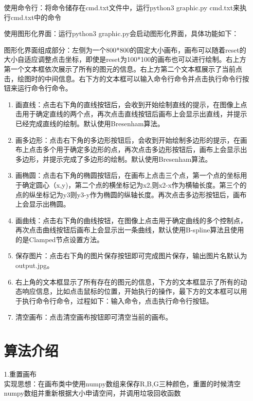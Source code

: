 \documentclass[a4paper,UTF8]{article}
\theoremstyle{definition}
\begin{document}
使用命令行：将命令储存在cmd.txt文件中，运行python3 graphic.py cmd.txt来执行cmd.txt中的命令

使用图形化界面：运行python3 graphic.py会启动图形化界面，具体功能如下：

图形化界面组成部分：左侧为一个800*800的固定大小画布，画布可以随着reset的大小自适应调整点击坐标，即使是reset为100*100的画布也可以进行绘制。右上方第一个文本框依次展示了所有的图元的信息。右上方第二个文本框展示了当前点击，绘图时的中间信息。右下方的文本框可以输入命令行命令并点击执行命令行按钮来运行命令行命令。

\begin{enumerate}
\item 画直线：点击右下角的直线按钮后，会收到开始绘制直线的提示，在图像上点击用于确定直线的两个点，再次点击直线按钮后画布上会显示出直线，并提示已经完成直线的绘制。默认使用Bresenham算法。
\item 画多边形：点击右下角的多边形按钮后，会收到开始绘制多边形的提示，在画布上点击多个用于确定多边形的点，再次点击多边形按钮后，画布上会显示出多边形，并提示完成了多边形的绘制。默认使用Bresenham算法。 
\item 画椭圆：点击右下角的椭圆按钮后，在画布上点击三个点，第一个点的坐标用于确定圆心（x,y)，第二个点的横坐标记为x2,则x2-x作为横轴长度。第三个的点的纵坐标记为y3则y3-y作为椭圆的纵轴长度。再次点击多边形按钮后，画布上会显示出椭圆。 
\item 画曲线：点击右下角的曲线按钮，在图像上点击用于确定曲线的多个控制点，再次点击曲线按钮后画布上会显示出一条曲线，默认使用B-spline算法且使用的是Clamped节点设置方法。
\item 保存图片：点击右下角的图片保存按钮即可完成图片保存，输出图片名默认为output.jpg。
\item 右上角的文本框显示了所有存在的图元的信息，下方的文本框显示了所有的动态响应信息，比如点击鼠标的位置，开始执行的操作，最下方的文本框可以用于执行命令行命令，过程如下：输入命令，点击执行命令行按钮。
\item 清空画布：点击清空画布按钮即可清空当前的画布。

\end{enumerate}


\section{算法介绍}

\noindent{}1.重置画布\\

\indent{}实现思想：在画布类中使用numpy数组来保存R,B,G三种颜色，重置的时候清空numpy数组并重新根据大小申请空间，并调用垃圾回收函数\\
\end{document}
